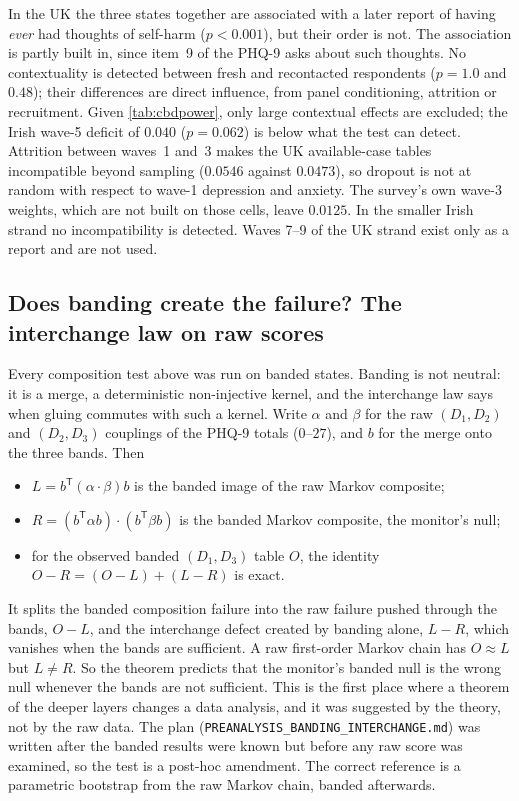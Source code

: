 \documentclass[11pt]{article}
\theoremstyle{definition}
\theoremstyle{remark}
\begin{document}
In the UK the three states together are associated with a later report of having \emph{ever} had thoughts of self-harm ($p<0.001$), but
their order is not. The association is partly built in, since item~9 of the PHQ-9 asks about such thoughts. No contextuality is detected
between fresh and recontacted respondents ($p=1.0$ and $0.48$); their differences are direct influence, from panel conditioning,
attrition or recruitment. Given \cref{tab:cbdpower}, only large contextual effects are excluded; the Irish wave-5 deficit of $0.040$
($p=0.062$) is below what the test can detect. Attrition between waves~1 and~3 makes the UK available-case tables incompatible beyond
sampling ($0.0546$ against $0.0473$), so dropout is not at random with respect to wave-1 depression and anxiety. The survey's own wave-3
weights, which are not built on those cells, leave $0.0125$. In the smaller Irish strand no incompatibility is detected. Waves 7--9 of
the UK strand exist only as a report and are not used.

\subsection{Does banding create the failure? The interchange law on raw scores}\label{sec:interchange}

Every composition test above was run on banded states. Banding is not neutral: it is a merge, a deterministic non-injective kernel, and
the interchange law \cite[Prop.~6.1]{Algebras} says when gluing commutes with such a kernel. Write $\alpha$ and $\beta$ for the raw
$(D_1,D_2)$ and $(D_2,D_3)$ couplings of the PHQ-9 totals ($0$--$27$), and $b$ for the merge onto the three bands. Then
\begin{itemize}[leftmargin=*,nosep]
\item $L=b^{\mathsf T}(\alpha\cdot\beta)b$ is the banded image of the raw Markov composite;
\item $R=(b^{\mathsf T}\alpha b)\cdot(b^{\mathsf T}\beta b)$ is the banded Markov composite, the monitor's null;
\item for the observed banded $(D_1,D_3)$ table $O$, the identity $O-R=(O-L)+(L-R)$ is exact.
\end{itemize}
It splits the banded composition failure into the raw failure pushed through the bands, $O-L$, and the interchange defect created by
banding alone, $L-R$, which vanishes when the bands are sufficient. A raw first-order Markov chain has $O\approx L$ but $L\ne R$. So the
theorem predicts that the monitor's banded null is the wrong null whenever the bands are not sufficient. This is the first place where a
theorem of the deeper layers changes a data analysis, and it was suggested by the theory, not by the raw data. The plan
(\texttt{PREANALYSIS\_BANDING\_INTERCHANGE.md}) was written after the banded results were known but before any raw score was examined,
so the test is a post-hoc amendment. The correct reference is a parametric bootstrap from the raw Markov chain, banded afterwards.
\end{document}
